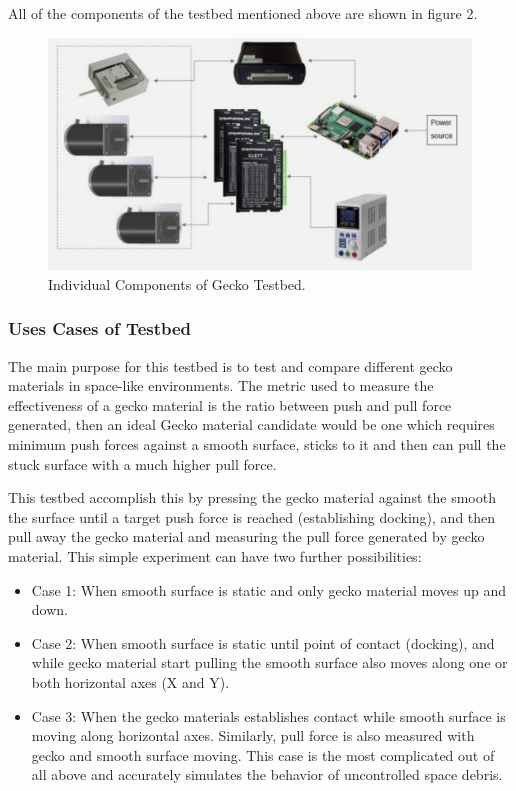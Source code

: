 \documentclass[
    twocolumn,
    fontsize = 10pt,
    parskip = half+,
    headings = small,
    headwidth = text,
    footwidth = text,
]{scrartcl}
\begin{document}
All of the components of the testbed mentioned above are shown in figure 2.

\begin{figure}[h]
    \centering
    \includegraphics[width=1.0\linewidth]{pics/gecko_testbed_components.png}
    \caption{Individual Components of Gecko Testbed.}
    \label{fig: gecko testbed components}
\end{figure}


\subsubsection{Uses Cases of Testbed}
The main purpose for this testbed is to test and compare different gecko materials in space-like environments. The metric used to measure the effectiveness of a gecko material is the ratio between push and pull force generated, then an ideal Gecko material candidate would be one which requires minimum push forces against a smooth surface, sticks to it and then can pull the stuck surface with a much higher pull force.

This testbed accomplish this by pressing the gecko material against the smooth the surface until a target push force is reached (establishing docking), and then pull away the gecko material and measuring the pull force generated by gecko material. This simple experiment can have two further possibilities: 

\begin{itemize}
    \item Case 1: When smooth surface is static and only gecko material moves up and down.
    \item Case 2: When smooth surface is static until point of contact (docking), and while gecko material start pulling the smooth surface also moves along one or both horizontal axes (X and Y).
    \item Case 3: When the gecko materials establishes contact while smooth surface is moving along horizontal axes. Similarly, pull force is also measured with gecko and smooth surface moving. This case is the most complicated out of all above and accurately simulates the behavior of uncontrolled space debris.
\end{itemize}
\end{document}
